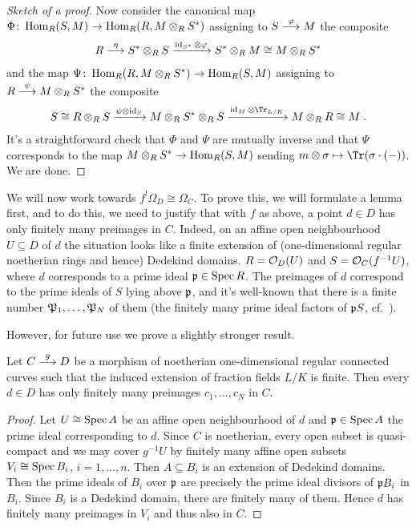 \documentclass[a4paper,parskip=half,numbers=enddot, DIV=12]{scrreprt}
\begin{document}
\begin{proof}[Sketch of a proof]
	Now consider the canonical map $\Phi\colon \Hom_R(S,M)\morphism\Hom_R(R,M\otimes_RS^*)$ assigning to $S\morphism[\phi]M$ the composite
	\begin{align*}
		R\morphism[\eta]S^*\otimes_RS\xrightarrow{\id_{S^*}\otimes \phi} S^*\otimes_RM\cong M\otimes_RS^*
	\end{align*}
	and the map $\Psi\colon \Hom_R(R,M\otimes_RS^*)\morphism\Hom_R(S,M)$ assigning to $R\morphism[\psi]M\otimes_RS^*$ the composite
	\begin{align*}
		S\cong R\otimes_RS\xrightarrow{\psi\otimes\id_S}M\otimes_RS^*\otimes_RS\xrightarrow{\id_M\otimes \Tr_{L/K}}M\otimes_RR\cong M\;.
	\end{align*}
	It's a straightforward check that $\Phi$ and $\Psi$ are mutually inverse and that $\Psi$ corresponds to the map $M\otimes_RS^*\morphism\Hom_R(S,M)$ sending $m\otimes\sigma\mapsto \Tr(\sigma\cdot(-))$. We are done.	
\end{proof}
We will now work towards $f^!\Omega_D\cong \Omega_C$. To prove this, we will formulate a lemma first, and to do this, we need to justify that with $f$ as above, a point $d\in D$ has only finitely many preimages in $C$. Indeed, on an affine open neighbourhood $U\subseteq D$ of $d$ the situation looks like a finite extension of (one-dimensional regular noetherian rings and hence) Dedekind domains. $R=\mathcal{O}_D(U)$ and $S=\mathcal{O}_C(f^{-1}U)$, where $d$ corresponds to a prime ideal $\mathfrak{p}\in\operatorname{Spec} R$. The preimages of $d$ correspond to the prime ideals of $S$ lying above $\mathfrak{p}$, and it's well-known that there is a finite number $\mathfrak{P}_1,\ldots,\mathfrak{P}_N$ of them (the finitely many prime ideal factors of $\mathfrak{p} S$, cf.\ \cite[Ch.~I, \S 8]{NEUKIRCH}).

However, for future use we prove a slightly stronger result.
\begin{lem}
	Let $C\morphism[g] D$ be a morphism of noetherian one-dimensional regular connected curves such that the induced extension of fraction fields $L/K$ is finite. Then every $d\in D$ has only finitely many preimages $c_1,\ldots,c_N$ in $C$.
\end{lem}
\begin{proof}
	Let $U\cong \operatorname{Spec} A$ be an affine open neighbourhood of $d$ and $\mathfrak{p}\in\operatorname{Spec} A$ the prime ideal corresponding to $d$. Since $C$ is noetherian, every open subset is quasi-compact and we may cover $g^{-1}U$ by finitely many affine open subsets $V_i\cong \operatorname{Spec} B_i$, $i=1,\ldots,n$. Then $A\subseteq B_i$ is an extension of Dedekind domains. Then the prime ideals of $B_i$ over $\mathfrak{p}$ are precisely the prime ideal divisors of $\mathfrak{p} B_i$ in $B_i$. Since $B_i$ is a Dedekind domain, there are finitely many of them. Hence $d$ has finitely many preimages in $V_i$ and thus also in $C$.
\end{proof}
\end{document}
